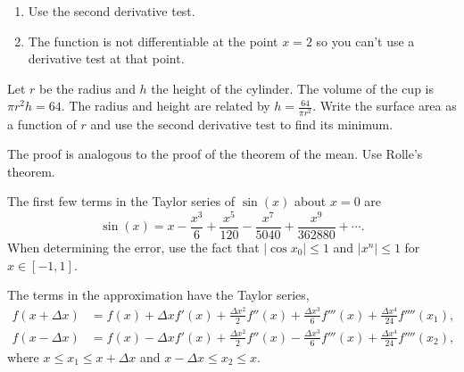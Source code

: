 


\begin{Hint}
  \label{hint max min x(12-2x)2}
  \renewcommand{\theenumi}{\alph{enumi}}
  \begin{enumerate}
  \item
    Use the second derivative test.
  \item
    The function is not differentiable at the point $x = 2$ so you can't use
    a derivative test at that point.
  \end{enumerate}
  \renewcommand{\theenumi}{\arabic{enumi}}
\end{Hint}







\begin{Hint}
  \label{hint surface area cup}
  Let $r$ be the radius and $h$ the height of the cylinder.  The volume of
  the cup is $\pi r^2 h = 64$.  The radius and height are related by
  $h = \frac{64}{\pi r^2}$.  Write the surface area as a function of $r$ and
  use the second derivative test to find its minimum.
\end{Hint}





\begin{Hint}
  \label{hint generalized theorem of the mean}
  The proof is analogous to the proof of the theorem of the mean.  
  Use Rolle's theorem.
\end{Hint}



\begin{Hint}
  \label{hint polynomial approximation sin x}
  The first few terms in the Taylor series of $\sin(x)$ about $x=0$ are
  \[
  \sin(x) = x - \frac{x^3}{6} + \frac{x^5}{120} - \frac{x^7}{5040}
  + \frac{x^9}{362880} + \cdots.
  \]
  When determining the error, use the fact that $|\cos x_0| \leq 1$ and
  $|x^n| \leq 1$ for $x \in [-1,1]$.
\end{Hint}




\begin{Hint}
  \label{hint second difference centered}
  The terms in the approximation have the Taylor series,
  \begin{align*}
    f(x+\Delta x) &= f(x) + \Delta x f'(x) + \frac{\Delta x^2}{2} f''(x)
    +\frac{\Delta x^3}{6} f'''(x) + \frac{\Delta x^4}{24} f''''(x_1), \\
    f(x-\Delta x) &= f(x) - \Delta x f'(x) + \frac{\Delta x^2}{2} f''(x)
    -\frac{\Delta x^3}{6} f'''(x) + \frac{\Delta x^4}{24} f''''(x_2),
  \end{align*}
  where $x \leq x_1 \leq x + \Delta x$ and $x - \Delta x \leq x_2 \leq x$.
\end{Hint}




